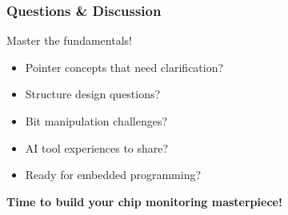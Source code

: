 \documentclass{beamer}
\begin{document}
\begin{frame}
\frametitle{Questions \& Discussion}
\begin{center}
\Large Master the fundamentals!
\end{center}

\begin{itemize}
    \item Pointer concepts that need clarification?
    \item Structure design questions?
    \item Bit manipulation challenges?
    \item AI tool experiences to share?
    \item Ready for embedded programming?
\end{itemize}

\vspace{1cm}
\begin{center}
\textbf{Time to build your chip monitoring masterpiece!}
\end{center}
\end{frame}
\end{document}
